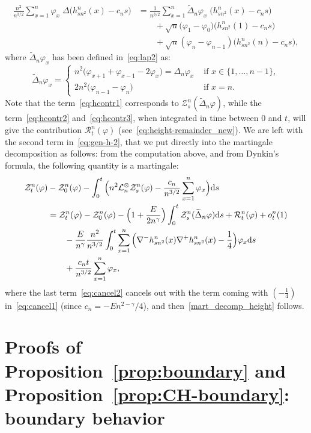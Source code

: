 \documentclass[10pt]{amsart}
\theoremstyle{definition}\newtheorem{defi}[theo]{Definition}\newtheorem{rema}[theo]{Remark}\newtheorem{exam}[theo]{Example}\newtheorem{exem}[theo]{Example}\newtheorem{nota}[theo]{Notation}
\newcommand{\mc}[1]{{\mathcal #1}}
\renewcommand{\mc}[1]{{\mathcal #1}}
\renewcommand{\tilde}{\widetilde}
\newcommand*{\dd}{\mathrm{d}}
\newcommand*{\ds}{\dd s}
\begin{document}
\begin{align}\label{eq:hcontr1}
\frac{n^2}{n^{3/2}} \sum_{x=1}^n \varphi_x \; \Delta \big(h_{sn^2}^n(x)-c_n s\big) &= \frac{1}{n^{3/2}}\sum_{x=1}^n \tilde\Delta_n\varphi_x\; \big(h^n_{sn^2}(x)-c_n s\big) \\
&\qquad +\sqrt n\big(\varphi_1-\varphi_0)\big(h_{sn^2}^n(1)-c_n s\big)\label{eq:hcontr2}\\
&\qquad + \sqrt n(\varphi_n-\varphi_{n-1})\big(h_{sn^2}^n(n)-c_n s \big),\label{eq:hcontr3}
\end{align}
where $\tilde\Delta_n\varphi_x$ has been defined in~\eqref{eq:lap2} as:
\[
\tilde\Delta_n\varphi_x =
\begin{cases}n^2\big(\varphi_{x+1} + \varphi_{x-1} - 2 \varphi_x\big)= \Delta_n\varphi_x & \text{ if } x \in \{1,\dots,n-1\},\\
2 n^2\big(\varphi_{n-1}-\varphi_n\big) & \text{ if }x=n.
\end{cases}
\]
Note that the term~\eqref{eq:hcontr1} corresponds to $\mc Z_s^n(\tilde\Delta_n\varphi)$, while the term~\eqref{eq:hcontr2} and~\eqref{eq:hcontr3}, when integrated in time between $0$ and $t$, will give the contribution $\mc R_t^n(\varphi)$ (see~\eqref{eq:height-remainder_new}). We are left with the second term in~\eqref{eq:gen-h-2}, that we put directly into the martingale decomposition as follows: from the computation above, and from Dynkin's formula, the following quantity is a martingale:
\begin{align}
\mc Z_t^n(\varphi) & -\mc Z_0^n(\varphi)- \int_0^t \Big(n^2 \mc L_n^\otimes \mc Z_s^n(\varphi) - \frac{c_n}{n^{3/2}}\sum_{x=1}^n\varphi_x\Big) \ds \notag \\
\notag & = \mc Z_t^n(\varphi) - \mc Z_0^n(\varphi) - \Big(1+\frac{E}{2n^\gamma} \Big)\int_0^t \mc Z_s^n(\tilde\Delta_n\varphi)\ds + \mc R_t^n(\varphi) +o^n_t(1)\\
& \qquad - \frac{E}{n^\gamma} \frac{n^2}{n^{3/2}} \int_0^t \sum_{x=1}^{n} \Big(\nabla^-h_{sn^2}^n(x)\nabla^+h_{sn^2}^n(x)-\frac14\Big)\varphi_x \ds \label{eq:cancel1}
\\
& \qquad + \frac{c_n t}{n^{3/2}} \sum_{x=1}^n \varphi_x,\label{eq:cancel2}
\end{align}
where the last term~\eqref{eq:cancel2} cancels out with the term coming with $(-\frac14)$ in~\eqref{eq:cancel1} (since $c_n = -En^{2-\gamma}/4$), and then~\eqref{mart_decomp_height} follows.


\section{Proofs of Proposition~\ref{prop:boundary} and Proposition~\ref{prop:CH-boundary}: boundary behavior}
\label{sec:proof-boundary}
\end{document}
